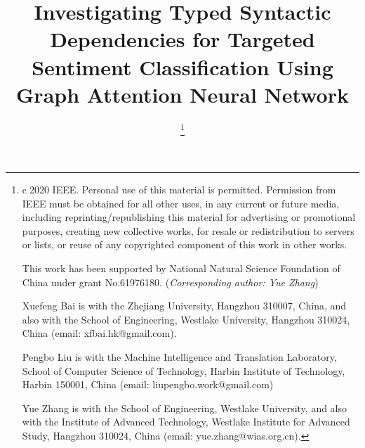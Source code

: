 \documentclass[journal]{IEEEtran}
\begin{document}
\title{Investigating Typed Syntactic Dependencies for Targeted Sentiment Classification Using Graph Attention Neural Network}
	
	
	


	\author{
		
		\thanks{
			\textcircled{c}2020 IEEE.  Personal use of this material is permitted.  Permission from IEEE must be obtained for all other uses, in any current or future media, including reprinting/republishing this material for advertising or promotional purposes, creating new collective works, for resale or redistribution to servers or lists, or reuse of any copyrighted component of this work in other works.
			
			This work has been supported by National Natural Science Foundation of China under grant No.61976180. (\textit{Corresponding author: Yue Zhang})
			
			Xuefeng Bai is with the Zhejiang University, Hangzhou 310007, China, and also with the School of Engineering, Westlake University, Hangzhou 310024, China (email: xfbai.hk@gmail.com).
			
			Pengbo Liu is with the Machine Intelligence and Translation Laboratory, School of Computer Science of Technology, Harbin Institute of Technology, Harbin 150001, China (email: liupengbo.work@gmail.com)
			
			Yue Zhang is with the School of Engineering, Westlake University, and also with the Institute of Advanced Technology, Westlake Institute for Advanced Study, Hangzhou 310024, China (email: yue.zhang@wias.org.cn).
	}}
	
	
	


	
	
	


	
	
\end{document}
